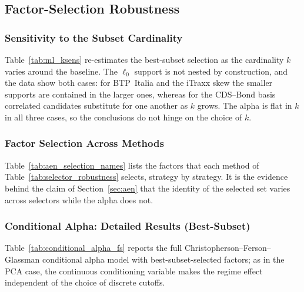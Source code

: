 




\subsection{Factor-Selection Robustness}
\label{app:aen_robustness}

\subsubsection{Sensitivity to the Subset Cardinality}
\label{app:aen_sensitivity}

Table~\ref{tab:ml_ksens} re-estimates the best-subset selection as the
cardinality $k$ varies around the baseline. The $\ell_0$ support is not
nested by construction, and the data show both cases: for BTP~Italia and
the iTraxx skew the smaller supports are contained in the larger ones,
whereas for the CDS--Bond basis correlated candidates substitute for one
another as $k$ grows. The alpha is flat in $k$ in all three cases, so the
conclusions do not hinge on the choice of $k$.



\subsubsection{Factor Selection Across Methods}
\label{app:aen_selection_matrix}

Table~\ref{tab:aen_selection_names} lists the factors that each method
of Table~\ref{tab:selector_robustness} selects, strategy by strategy.
It is the evidence behind the claim of Section~\ref{sec:aen} that the
identity of the selected set varies across selectors while the alpha
does not.




\clearpage
\subsubsection{Conditional Alpha: Detailed Results (Best-Subset)}
\label{app:aen_conditional}

Table~\ref{tab:conditional_alpha_fs} reports the full
Christopherson--Ferson--Glassman conditional alpha model with
best-subset-selected factors; as in the PCA case, the continuous conditioning
variable makes the regime effect independent of the choice of discrete
cutoffs.


